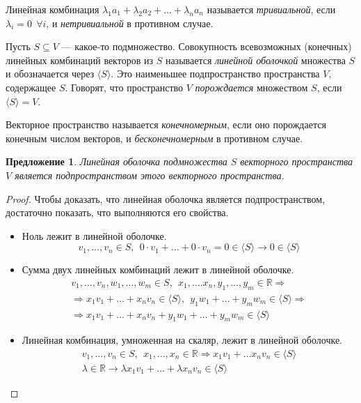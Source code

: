 \documentclass[a4paper, 12pt]{article}
\newtheorem*{que40suggest}{Предложение}
\newcommand{\bbR}[0]{\mathbb{R}}
\begin{document}
Линейная комбинация $\lambda_1 a_1 + \lambda_2 a_2 + \dots + \lambda_n a_n$ называется \textit{тривиальной}, если $\lambda_i = 0 \ \ \forall i$, и \textit{нетривиальной} в противном случае.

Пусть $S \subseteq V$ — какое-то подмножество. Совокупность всевозможных (конечных) линейных комбинаций векторов из $S$ называется \textit{линейной оболочкой} множества $S$ и обозначается через $\langle S \rangle$. Это наименьшее подпространство пространства $V$, содержащее $S$. Говорят, что пространство $V$ \textit{порождается} множеством $S$, если $\langle S \rangle = V$.

Векторное пространство называется \textit{конечномерным}, если оно порождается конечным числом векторов, и \textit{бесконечномерным} в противном случае.

\begin{que40suggest}
Линейная оболочка подмножества $S$ векторного пространства $V$ является подпространством этого векторного пространства.
\end{que40suggest}

\begin{proof}
Чтобы доказать, что линейная оболочка является подпространством, достаточно показать, что выполняются его свойства.
\begin{itemize}
\item Ноль лежит в линейной оболочке.
$$v_1, \ldots, v_n \in S, \ \ 0 \cdot v_1 + \ldots + 0 \cdot v_n = 0 \in \langle S \rangle \rightarrow 0 \in \langle S \rangle
$$
\item Сумма двух линейных комбинаций лежит в линейной оболочке.
\begin{gather*}
v_1, \ldots, v_n, w_1, \ldots, w_m \in S, \ \ x_1, \ldots. x_n, y_1, \ldots, y_m \in \bbR \Rightarrow \\
\Rightarrow x_1v_1 + \ldots + x_nv_n \in \langle S \rangle, \ \  y_1w_1 + \ldots + y_mw_m \in \langle S \rangle \Rightarrow \\
\Rightarrow x_1v_1 + \ldots + x_nv_n + y_1w_1 + \ldots + y_mw_m \in \langle S \rangle
\end{gather*}
\item Линейная комбинация, умноженная на скаляр, лежит в линейной оболочке.
\begin{gather*}
v_1, \ldots, v_n \in S, \ \ x_1, \ldots, x_n \in \bbR \Rightarrow x_1v_1 + \ldots x_nv_n \in \langle S \rangle \\
\lambda \in \bbR \rightarrow \lambda x_1 v_1 + \ldots + \lambda x_n v_n \in \langle S \rangle
\end{gather*}
\end{itemize}
\end{proof}
\end{document}
